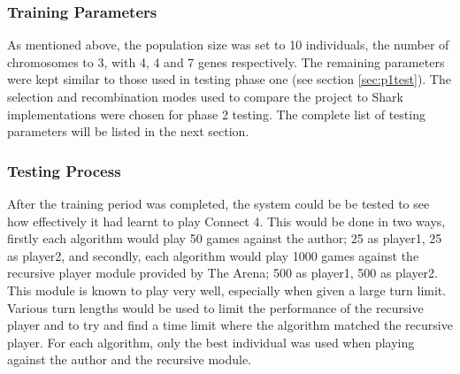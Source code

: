 \subsubsection{Training Parameters}
As mentioned above, the population size was set to 10 individuals, the number of chromosomes to 3, with 4, 4 and 7 genes respectively. The remaining parameters were kept similar to those used in testing phase one (see section \ref{sec:p1test}). The selection and recombination modes used to compare the project to Shark implementations were chosen for phase 2 testing. The complete list of testing parameters will be listed in the next section.

\subsubsection{Testing Process}
After the training period was completed, the system could be be tested to see how effectively it had learnt to play Connect 4. This would be done in two ways, firstly each algorithm would play 50 games against the author; 25 as player1, 25 as player2, and secondly, each algorithm would play 1000 games against the recursive player module provided by The Arena; 500 as player1, 500 as player2. This module is known to play very well, especially when given a large turn limit. Various turn lengths would be used to limit the performance of the recursive player and to try and find a time limit where the algorithm matched the recursive player. For each algorithm, only the best individual was used when playing against the author and the recursive module.